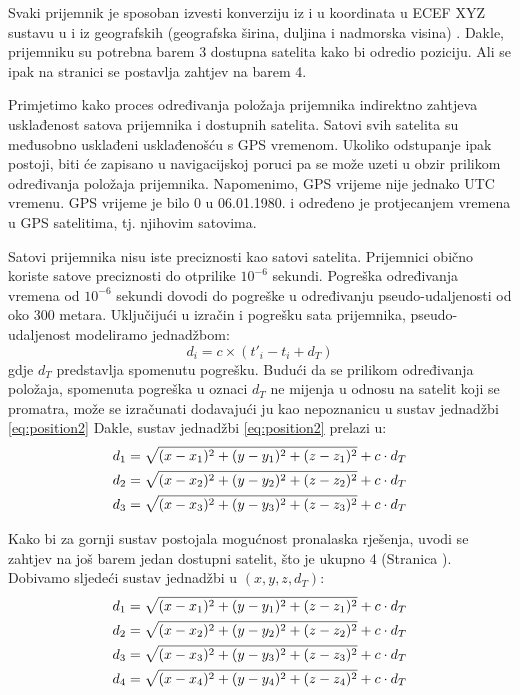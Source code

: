\documentclass[a4paper,twoside,12pt]{memoir} %
\begin{document}
	Svaki prijemnik je sposoban izvesti konverziju iz i u koordinata u ECEF XYZ sustavu 
	u i iz geografskih (geografska širina, duljina i nadmorska visina) \cite{GPS:overview}.
	Dakle, prijemniku su potrebna barem 3 dostupna satelita kako bi odredio poziciju.
	Ali se ipak na stranici \pageref{stranica:4satelita} se postavlja zahtjev na barem 4. 
	
	Primjetimo kako proces određivanja položaja prijemnika
	indirektno zahtjeva usklađenost satova prijemnika i dostupnih satelita.
	Satovi svih satelita su međusobno usklađeni usklađenošću s GPS vremenom. Ukoliko odstupanje ipak postoji, biti će zapisano u navigacijskoj poruci pa se može uzeti u obzir prilikom određivanja položaja prijemnika.
	Napomenimo, GPS vrijeme nije jednako UTC vremenu. GPS vrijeme je bilo 0 u 06.01.1980. i određeno je protjecanjem vremena u GPS satelitima, tj. njihovim 
	satovima. 
	
	Satovi prijemnika nisu iste preciznosti kao satovi satelita.
	Prijemnici obično koriste satove preciznosti do otprilike $10^{-6}$ sekundi.
	Pogreška određivanja vremena od $10^{-6}$ sekundi dovodi do pogreške u
	određivanju pseudo-udaljenosti od oko 300 metara.
	Uključijući u izračin i pogrešku sata prijemnika, pseudo-udaljenost modeliramo jednadžbom:
	$$d_i = c\times(t'_i- t_i+ d_T)$$
	gdje $d_T$ predstavlja spomenutu pogrešku.
	Budući da se prilikom određivanja položaja, 
	spomenuta pogreška u oznaci $d_T$ ne mijenja u odnosu na satelit koji se promatra,
	može se izračunati dodavajući ju kao nepoznanicu u sustav jednadžbi \ref{eq:position2}
	Dakle, sustav jednadžbi \ref{eq:position2} prelazi u:
	\begin{align}\label{eq:position3}
	d_1 = \sqrt{(x-x_1)^{2}+(y-y_1)^{2}+(z-z_1)^{2}} + c\cdot d_T \notag \\
	d_2 = \sqrt{(x-x_2)^{2}+(y-y_2)^{2}+(z-z_2)^{2}} + c\cdot d_T  \\
	d_3 = \sqrt{(x-x_3)^{2}+(y-y_3)^{2}+(z-z_3)^{2}} + c\cdot d_T \notag 
	\end{align}
	
	Kako bi za gornji sustav postojala mogućnost pronalaska rješenja,
	uvodi se zahtjev na još barem jedan dostupni satelit, što je ukupno 4 (Stranica \pageref{stranica:4satelita}).
	Dobivamo sljedeći sustav jednadžbi u $(x,y,z,d_T)$:
	\begin{align}\label{eq:1}
	 d_1 = \sqrt{(x-x_1)^{2}+(y-y_1)^{2}+(z-z_1)^{2}} + c\cdot d_T \notag \\
	 d_2 = \sqrt{(x-x_2)^{2}+(y-y_2)^{2}+(z-z_2)^{2}} + c\cdot d_T  \\
	 d_3 = \sqrt{(x-x_3)^{2}+(y-y_3)^{2}+(z-z_3)^{2}} + c\cdot d_T \notag \\
	 d_4 = \sqrt{(x-x_4)^{2}+(y-y_4)^{2}+(z-z_4)^{2}} + c\cdot d_T \notag
	\end{align}
	
\end{document}
